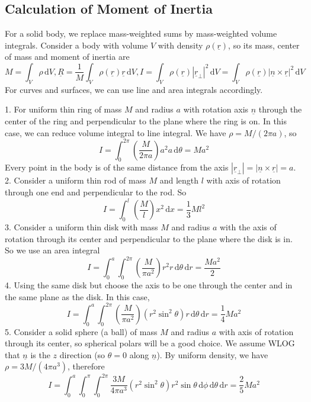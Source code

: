\subsection{Calculation of Moment of Inertia}
For a solid body, we replace mass-weighted sums by mass-weighted volume integrals.
Consider a body with volume $V$ with density $\rho(\underline{r})$, so its mass, center of mass and moment of inertia are
$$M=\int_V\rho\,\mathrm dV,\underline{R}=\frac{1}{M}\int_V\rho(\underline{r})\underline{r}\,\mathrm dV,I=\int_V\rho(\underline{r})|\underline{r}_\perp|^2\,\mathrm dV=\int_V\rho(\underline{r})|\underline{n}\times\underline{r}|^2\,\mathrm dV$$
For curves and surfaces, we can use line and area integrals accordingly.
\begin{example}
    1. For uniform thin ring of mass $M$ and radius $a$ with rotation axis $\underline{n}$ through the center of the ring and perpendicular to the plane where the ring is on.
    In this case, we can reduce volume integral to line integral.
    We have $\rho=M/(2\pi a)$, so
    $$I=\int_0^{2\pi}\left( \frac{M}{2\pi a} \right)a^2a\,\mathrm d\theta=Ma^2$$
    Every point in the body is of the same distance from the axis $|\underline{r}_\perp|=|\underline{n}\times\underline{r}|=a$.\\
    2. Consider a uniform thin rod of mass $M$ and length $l$ with axis of rotation through one end and perpendicular to the rod.
    So
    $$I=\int_0^l\left( \frac{M}{l} \right)x^2\,\mathrm dx=\frac{1}{3}Ml^2$$
    3. Consider a uniform thin disk with mass $M$ and radius $a$ with the axis of rotation through its center and perpendicular to the plane where the disk is in.
    So we use an area integral
    $$I=\int_0^a\int_0^{2\pi}\left( \frac{M}{\pi a^2} \right)r^2r\,\mathrm d\theta\,\mathrm dr=\frac{Ma^2}{2}$$
    4. Using the same disk but choose the axis to be one through the center and in the same plane as the disk.
    In this case,
    $$I=\int_0^a\int_0^{2\pi}\left( \frac{M}{\pi a^2} \right)(r^2\sin^2\theta)r\,\mathrm d\theta\,\mathrm dr=\frac{1}{4}Ma^2$$
    5. Consider a solid sphere (a ball) of mass $M$ and radius $a$ with axis of rotation through its center, so spherical polars will be a good choice.
    We assume WLOG that $\underline{n}$ is the $z$ direction (so $\theta=0$ along $\underline{n}$).
    By uniform density, we have $\rho=3M/(4\pi a^3)$, therefore
    $$I=\int_0^a\int_0^\pi\int_0^{2\pi}\frac{3M}{4\pi a^3}(r^2\sin^2\theta)r^2\sin\theta\,\mathrm d\phi\,\mathrm d\theta\,\mathrm dr=\frac{2}{5}Ma^2$$
\end{example}
